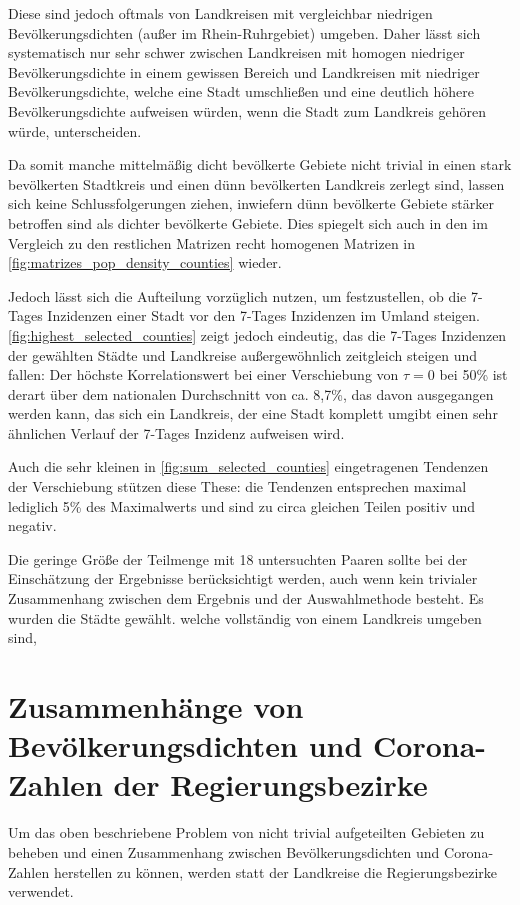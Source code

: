 Diese sind jedoch oftmals von Landkreisen mit vergleichbar niedrigen Bevölkerungsdichten (außer im Rhein-Ruhrgebiet) umgeben. Daher lässt sich systematisch nur sehr schwer zwischen Landkreisen mit homogen niedriger Bevölkerungsdichte in einem gewissen Bereich und Landkreisen mit niedriger Bevölkerungsdichte, welche eine Stadt umschließen und eine deutlich höhere Bevölkerungsdichte aufweisen würden, wenn die Stadt zum Landkreis gehören würde, unterscheiden.

Da somit manche mittelmäßig dicht bevölkerte Gebiete nicht trivial in einen stark bevölkerten Stadtkreis und einen dünn bevölkerten Landkreis zerlegt sind, lassen sich keine Schlussfolgerungen ziehen, inwiefern dünn bevölkerte Gebiete stärker betroffen sind als dichter bevölkerte Gebiete. Dies spiegelt sich auch in den im Vergleich zu den restlichen Matrizen recht homogenen Matrizen in \autoref{fig:matrizes_pop_density_counties} wieder.

Jedoch lässt sich die Aufteilung vorzüglich nutzen, um festzustellen, ob die 7-Tages Inzidenzen einer Stadt vor den 7-Tages Inzidenzen im Umland steigen.
\autoref{fig:highest_selected_counties} zeigt jedoch eindeutig, das die 7-Tages Inzidenzen der gewählten Städte und Landkreise außergewöhnlich zeitgleich steigen und fallen: Der höchste Korrelationswert bei einer Verschiebung von $\tau=0$ bei 50\% ist derart über dem nationalen Durchschnitt von ca. 8,7\%, das davon ausgegangen werden kann, das sich ein Landkreis, der eine Stadt komplett umgibt einen sehr ähnlichen Verlauf der 7-Tages Inzidenz aufweisen wird.

Auch die sehr kleinen in \autoref{fig:sum_selected_counties} eingetragenen Tendenzen der Verschiebung stützen diese These: die Tendenzen entsprechen maximal lediglich 5\% des Maximalwerts und sind zu circa gleichen Teilen positiv und negativ.

Die geringe Größe der Teilmenge mit 18 untersuchten Paaren sollte bei der Einschätzung der Ergebnisse berücksichtigt werden, auch wenn kein trivialer Zusammenhang zwischen dem Ergebnis und der Auswahlmethode besteht. Es wurden die Städte gewählt. welche vollständig von einem Landkreis umgeben sind,

\section{Zusammenhänge von Bevölkerungsdichten und Corona-Zahlen der Regierungsbezirke}\label{sec:discussion:pop_density_districts}
Um das oben beschriebene Problem von nicht trivial aufgeteilten Gebieten zu beheben und einen Zusammenhang zwischen Bevölkerungsdichten und Corona-Zahlen herstellen zu können, werden statt der Landkreise die Regierungsbezirke verwendet.

